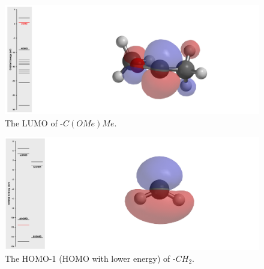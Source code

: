 \documentclass[twocolumn]{article} %
\begin{document}
\begin{figure}[h!]
      \centering
      \includegraphics[width=0.95\columnwidth]{C(OMe)Me LUMO white.png} %
      \vspace{2mm} %
      \caption{The LUMO of -$C(OMe)Me$.}
\end{figure}

\begin{figure}[h!]
      \centering
      \includegraphics[width=0.95\columnwidth]{CH2 HOMO-1.png} %
      \vspace{2mm} %
      \caption{The HOMO-1 (HOMO with lower energy) of -$CH_2$.}
\end{figure}
\end{document}
